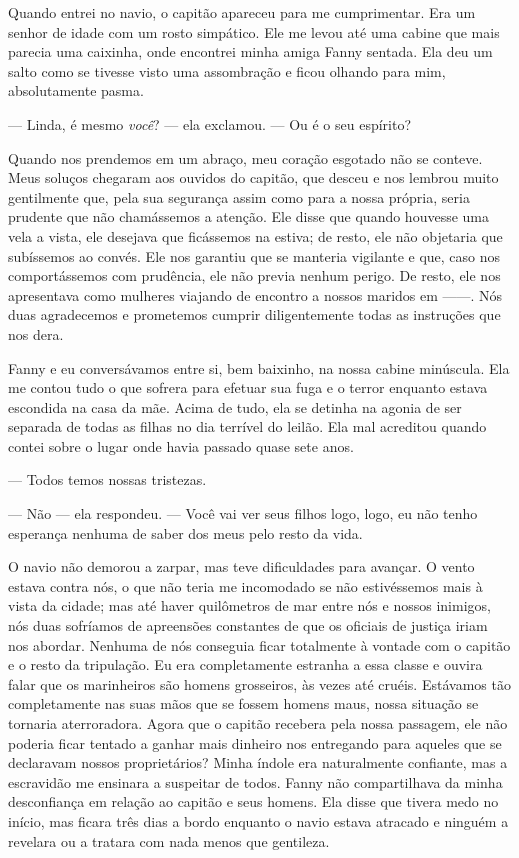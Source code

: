 Quando entrei no navio, o capitão
apareceu para me cumprimentar. Era um senhor de idade com um rosto
simpático. Ele me levou até uma cabine que mais parecia uma caixinha,
onde encontrei minha amiga Fanny sentada. Ela deu um salto como se
tivesse visto uma assombração e ficou olhando para mim, absolutamente
pasma.

--- Linda, é mesmo \emph{você}? --- ela exclamou. --- Ou é o seu
espírito?

Quando nos prendemos em um abraço, meu coração esgotado não se conteve.
Meus soluços chegaram aos ouvidos do capitão, que desceu e nos lembrou
muito gentilmente que, pela sua segurança assim como para a nossa
própria, seria prudente que não chamássemos a atenção. Ele disse que
quando houvesse uma vela a vista, ele desejava que ficássemos na estiva;
de resto, ele não objetaria que subíssemos ao convés. Ele nos garantiu
que se manteria vigilante e que, caso nos comportássemos com prudência,
ele não previa nenhum perigo. De resto, ele nos apresentava como
mulheres viajando de encontro a nossos maridos em ------. Nós duas
agradecemos e prometemos cumprir diligentemente todas as instruções que
nos dera.

Fanny e eu conversávamos entre si, bem
baixinho, na nossa cabine minúscula. Ela me contou tudo o que sofrera
para efetuar sua fuga e o terror enquanto estava escondida na casa da
mãe. Acima de tudo, ela se detinha na agonia de ser separada de todas as
filhas no dia terrível do leilão. Ela mal acreditou quando contei sobre
o lugar onde havia passado quase sete anos.

--- Todos temos nossas tristezas.

--- Não --- ela respondeu. --- Você vai ver seus filhos logo, logo, eu
não tenho esperança nenhuma de saber dos meus pelo resto da vida.

O navio não demorou a zarpar, mas teve
dificuldades para avançar. O vento estava contra nós, o que não teria me
incomodado se não estivéssemos mais à vista da cidade; mas até haver
quilômetros de mar entre nós e nossos inimigos, nós duas sofríamos de
apreensões constantes de que os oficiais de justiça iriam nos abordar.
Nenhuma de nós conseguia ficar totalmente à vontade com o capitão e o
resto da tripulação. Eu era completamente estranha a essa classe e
ouvira falar que os marinheiros são homens grosseiros, às vezes até
cruéis. Estávamos tão completamente nas suas mãos que se fossem homens
maus, nossa situação se tornaria aterroradora. Agora que o capitão
recebera pela nossa passagem, ele não poderia ficar tentado a ganhar
mais dinheiro nos entregando para aqueles que se declaravam nossos
proprietários? Minha índole era naturalmente confiante, mas a escravidão
me ensinara a suspeitar de todos. Fanny não compartilhava da minha
desconfiança em relação ao capitão e seus homens. Ela disse que tivera
medo no início, mas ficara três dias a bordo enquanto o navio estava
atracado e ninguém a revelara ou a tratara com nada menos que gentileza.

